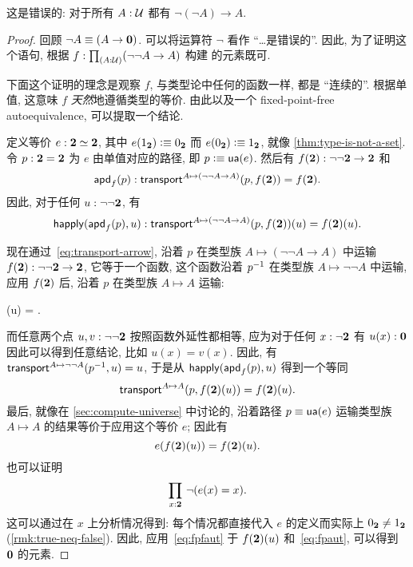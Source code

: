 \begin{thm}
    \label{thm:not-dneg}
    这是错误的: 对于所有 $A:\mathcal{U}$ 都有 $\neg(\neg A) \to A$.
\end{thm}
\begin{proof}
    回顾 $\neg A \equiv (A\to\mathbf{0})$.
    可以将运算符 $\neg$ 看作 ``\dots 是错误的''.
    因此, 为了证明这个语句, 根据 $f:\prd{A:\UU} (\neg\neg A \to A)$ 构建 \emptyt 的元素既可.

    下面这个证明的理念是观察 $f$, 与类型论中任何的函数一样, 都是 ``连续的''.
    根据单值, 这意味 $f$ \emph{天然}地遵循类型的等价.
    由此以及一个 fixed-point-free autoequivalence, 可以提取一个结论.

    定义等价 $e:\mathbf{2} \simeq \mathbf{2}$, 其中 $e({1_{\mathbf{2}}})\vcentcolon\equiv{0_{\ensuremath{\mathbf{2}}}}$ 而 $e({0_{\mathbf{2}}})\vcentcolon\equiv{1_{\ensuremath{\mathbf{2}}}}$, 就像 \cref{thm:type-is-not-a-set}.
    令 $p:\mathbf{2}=\mathbf{2}$ 为 $e$ 由单值对应的路径, 即 $p\vcentcolon\equiv \mathsf{ua}(e)$.
    然后有 $f(\mathbf{2}) : \neg\neg\mathbf{2} \to\mathbf{2}$ 和
    \[\mathsf{apd}_{f}\mathopen{}\left(p\right)\mathclose{} : \mathsf{transport}^{A\mapsto (\neg\neg A \to A)}(p,f(\mathbf{2})) = f(\mathbf{2}).\]
    因此, 对于任何 $u:\neg\neg\mathbf{2}$, 有
    \[\mathsf{happly}(\mathsf{apd}_{f}\mathopen{}\left(p\right)\mathclose{},u) : \mathsf{transport}^{A\mapsto (\neg\neg A \to A)}(p,f(\mathbf{2}))(u) = f(\mathbf{2})(u).\]

    现在通过~\eqref{eq:transport-arrow}, 沿着 $p$ 在类型族 ${A\mapsto (\neg\neg A \to A)}$ 中运输 $f(\mathbf{2}):\neg\neg\mathbf{2}\to\mathbf{2}$, 它等于一个函数, 这个函数沿着 $\mathord{{p}^{-1}}$ 在类型族 $A\mapsto \neg\neg A$ 中运输, 应用 $f(\mathbf{2})$ 后, 沿着 $p$ 在类型族 $A\mapsto A$ 运输:
    \begin{narrowmultline*}
        (u) =
        \narrowbreak
        .
    \end{narrowmultline*}
    而任意两个点 $u,v:\neg\neg\mathbf{2}$ 按照函数外延性都相等, 应为对于任何 $x:\neg\mathbf{2}$ 有 $u(x):\mathbf{0}$ 因此可以得到任意结论, 比如 $u(x)=v(x)$.
    因此, 有 $\mathsf{transport}^{A\mapsto \neg\neg A}(\mathord{{p}^{-1}},u) = u$, 于是从 $\mathsf{happly}(\mathsf{apd}_{f}\mathopen{}\left(p\right)\mathclose{},u)$ 得到一个等同
    \[ \mathsf{transport}^{A\mapsto A}(p,f(\mathbf{2})(u)) = f(\mathbf{2})(u).\]
    最后, 就像在 \cref{sec:compute-universe} 中讨论的, 沿着路径 $p\equiv \mathsf{ua}(e)$ 运输类型族 $A\mapsto A$ 的结果等价于应用这个等价 $e$;
    因此有
    \begin{equation}
        e(f(\bool)(u)) = f(\bool)(u).\label{eq:fpaut}
    \end{equation}
    也可以证明
    \begin{equation}
        \prd{x:\bool} \neg(e(x)=x).\label{eq:fpfaut}
    \end{equation}
    这可以通过在 $x$ 上分析情况得到: 每个情况都直接代入 $e$ 的定义而实际上 ${0_{\mathbf{2}}}\neq{1_{\ensuremath{\mathbf{2}}}}$ (\cref{rmk:true-neq-false}).
    因此, 应用~\eqref{eq:fpfaut} 于 $f(\mathbf{2})(u)$ 和~\eqref{eq:fpaut}, 可以得到 $\mathbf{0}$ 的元素.
\end{proof}

